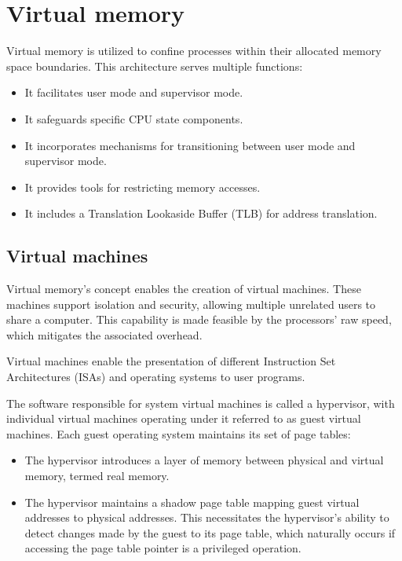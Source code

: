 \section{Virtual memory}

Virtual memory is utilized to confine processes within their allocated memory space boundaries. 
This architecture serves multiple functions:
\begin{itemize}
    \item It facilitates user mode and supervisor mode.
    \item It safeguards specific CPU state components.
    \item It incorporates mechanisms for transitioning between user mode and supervisor mode.
    \item It provides tools for restricting memory accesses.
    \item It includes a Translation Lookaside Buffer (TLB) for address translation.
\end{itemize}

\subsection{Virtual machines}
Virtual memory's concept enables the creation of virtual machines.
These machines support isolation and security, allowing multiple unrelated users to share a computer. 
This capability is made feasible by the processors' raw speed, which mitigates the associated overhead.

Virtual machines enable the presentation of different Instruction Set Architectures (ISAs) and operating systems to user programs.

The software responsible for system virtual machines is called a hypervisor, with individual virtual machines operating under it referred to as guest virtual machines.
Each guest operating system maintains its set of page tables:
\begin{itemize}
    \item The hypervisor introduces a layer of memory between physical and virtual memory, termed real memory.
    \item The hypervisor maintains a shadow page table mapping guest virtual addresses to physical addresses. 
        This necessitates the hypervisor's ability to detect changes made by the guest to its page table, which naturally occurs if accessing the page table pointer is a privileged operation.
\end{itemize}